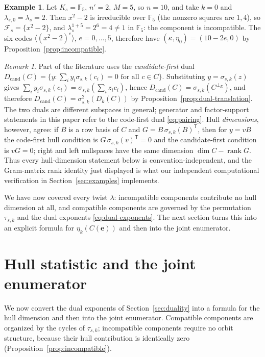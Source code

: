 \documentclass[preprint,12pt,a4paper]{elsarticle}
\newcommand{\F}{\mathbb F}
\newcommand{\Fs}{\mathcal F_s}
\newcommand{\rank}{\operatorname{rank}}
\newcommand{\Dk}{D_k}
\newcommand{\perpE}{\perp_{E}}
\theoremstyle{definition}
\newtheorem{example}[theorem]{Example}
\theoremstyle{remark}
\newtheorem{remark}[theorem]{Remark}
\begin{document}
\begin{example}\label{ex:incompatible}
Let $K_s=\F_5$, $n'=2$, $M=5$, so $n=10$, and take $k=0$ and
$\lambda_{s,0}=\lambda_s=2$.  Then $x^2-2$ is irreducible over $\F_5$ (the
nonzero squares are $1,4$), so $\Fs=\{x^2-2\}$, and
$\lambda_s^{1+5}=2^6=4\neq1$ in $\F_5$: the component is incompatible.  The six
codes $\langle(x^2-2)^e\rangle$, $e=0,\ldots,5$, therefore have
$(\kappa,\eta_0)=(10-2e,0)$ by Proposition~\ref{prop:incompatible}.
\end{example}

\begin{remark}\label{rem:candidate}
Part of the literature uses the \emph{candidate-first} dual
$D_{\mathrm{cand}}(C)=\{y:\sum_i y_i\sigma_{s,k}(c_i)=0\text{ for all }c\in C\}$.
Substituting $y=\sigma_{s,k}(z)$ gives
$\sum_i y_i\sigma_{s,k}(c_i)=\sigma_{s,k}(\sum_i z_ic_i)$, hence
$D_{\mathrm{cand}}(C)=\sigma_{s,k}(C^{\perpE})$, and therefore
$D_{\mathrm{cand}}(C)=\sigma_{s,k}^2(\Dk(C))$ by
Proposition~\ref{prop:dual-translation}.  The two duals are different subspaces
in general; generator and factor-support statements in this paper refer to the
code-first dual \eqref{eq:pairing}.  Hull \emph{dimensions}, however, agree:
if $B$ is a row basis of $C$ and $G=B\,\sigma_{s,k}(B)^{\mathsf T}$, then for
$y=vB$ the code-first hull condition is $G\,\sigma_{s,k}(v)^{\mathsf T}=0$ and
the candidate-first condition is $vG=0$; right and left nullspaces have the
same dimension $\dim C-\rank G$.  Thus every hull-dimension statement below is
convention-independent, and the Gram-matrix rank identity just displayed is
what our independent computational verification in
Section~\ref{sec:examples} implements.
\end{remark}

We have now covered every twist $\lambda$: incompatible components contribute
no hull dimension at all, and compatible components are governed by the
permutation $\tau_{s,k}$ and the dual exponents
\eqref{eq:dual-exponents}.  The next section turns this into an explicit
formula for $\eta_k(C(\mathbf{e}))$ and then into the joint enumerator.

\section{Hull statistic and the joint enumerator}\label{sec:enumerator}

We now convert the dual exponents of Section~\ref{sec:duality} into a formula
for the hull dimension and then into the joint enumerator.  Compatible
components are organized by the cycles of $\tau_{s,k}$; incompatible components
require no orbit structure, because their hull contribution is identically zero
(Proposition~\ref{prop:incompatible}).
\end{document}
